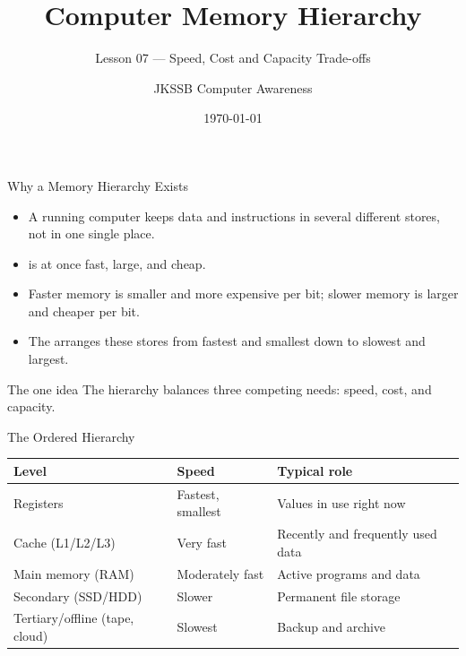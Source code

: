 \documentclass[aspectratio=169]{beamer}
\title{Computer Memory Hierarchy}
\subtitle{Lesson 07 --- Speed, Cost and Capacity Trade-offs}
\author{JKSSB Computer Awareness}
\date{\today}
\begin{document}
\frame{\titlepage}

\begin{frame}{Why a Memory Hierarchy Exists}
  \begin{itemize}
    \item A running computer keeps data and instructions in several
      different stores, not in one single place.
    \item {} is at once fast, large, and cheap.
    \item Faster memory is smaller and more expensive per bit; slower
      memory is larger and cheaper per bit.
    \item The  arranges these stores from fastest and
      smallest down to slowest and largest.
  \end{itemize}
  \begin{block}{The one idea}
    The hierarchy balances three competing needs: speed, cost, and capacity.
  \end{block}
\end{frame}

\begin{frame}{The Ordered Hierarchy}
  \begin{center}
    \begin{tabular}{p{}p{}p{}}
      \toprule
      \textbf{Level} & \textbf{Speed} & \textbf{Typical role} \\
      \midrule
      Registers & Fastest, smallest & Values in use right now \\
      Cache (L1/L2/L3) & Very fast & Recently and frequently used data \\
      Main memory (RAM) & Moderately fast & Active programs and data \\
      Secondary (SSD/HDD) & Slower & Permanent file storage \\
      Tertiary/offline (tape, cloud) & Slowest & Backup and archive \\
      \bottomrule
    \end{tabular}
  \end{center}
  \vspace{0.25cm}
\end{frame}
\end{document}

